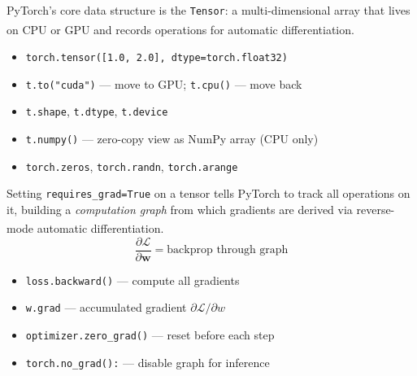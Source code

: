 \begin{tcbitemize}[ skin=sectionraster ]
    \tcbitem[title={PyTorch Tensors}, raster multicolumn=3]
    PyTorch's core data structure is the \texttt{Tensor}: a multi-dimensional array that lives on CPU or GPU and records operations for automatic differentiation\textsuperscript{\cite{raschkaPythonMachineLearning2015}}.
    \tcblower
    \begin{itemize}
        \item \texttt{torch.tensor([1.0, 2.0], dtype=torch.float32)}
        \item \texttt{t.to("cuda")} --- move to GPU; \texttt{t.cpu()} --- move back
        \item \texttt{t.shape}, \texttt{t.dtype}, \texttt{t.device}
        \item \texttt{t.numpy()} --- zero-copy view as NumPy array (CPU only)
        \item \texttt{torch.zeros}, \texttt{torch.randn}, \texttt{torch.arange}
    \end{itemize}

    \tcbitem[title={Autograd and the Computation Graph}, raster multicolumn=3]
    Setting \texttt{requires\_grad=True} on a tensor tells PyTorch to track all operations on it, building a \emph{computation graph} from which gradients are derived via reverse-mode automatic differentiation\textsuperscript{\cite{raschkaPythonMachineLearning2015}}.
    \tcblower
    \begin{equation}
        \frac{\partial \mathcal{L}}{\partial \mathbf{w}} = \text{backprop through graph}
    \end{equation}
    \begin{itemize}
        \item \texttt{loss.backward()} --- compute all gradients
        \item \texttt{w.grad} --- accumulated gradient $\partial\mathcal{L}/\partial w$
        \item \texttt{optimizer.zero\_grad()} --- reset before each step
        \item \texttt{torch.no\_grad():} --- disable graph for inference
    \end{itemize}


\end{tcbitemize}
